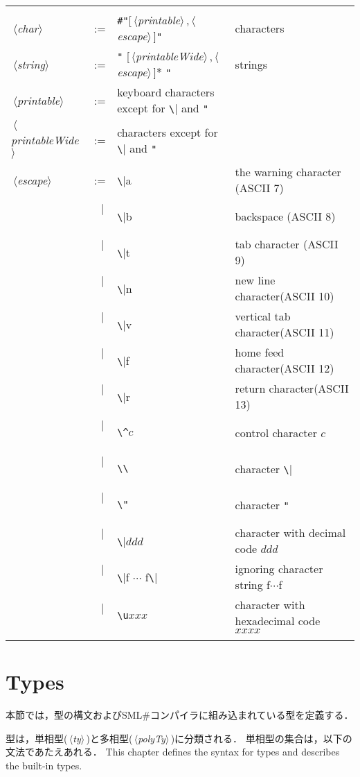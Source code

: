 \documentclass{jbook}
\newcommand{\txt}[2]{#2}
\newcommand{\smlsharp}{SML\#}
\newcommand{\vbar}{\mbox{\ $|$\ }}
\newcommand{\nonterm}[1]{\mbox{$\,\langle$}{\it #1}\mbox{$\rangle\,$}}
\begin{document}
\begin{description}
\begin{center}
\begin{tabular}{lcll}
&\\
\nonterm{char} &:=& \verb|#"|[\nonterm{printable},\nonterm{escape}]\verb|"|&characters\\
\nonterm{string} &:=& \verb|"| [\nonterm{printableWide},\nonterm{escape}]$*$ \verb|"|&strings\\
\nonterm{printable} &:=& keyboard characters except for \verb|\| and \verb|"|\\
\nonterm{printableWide} &:=& characters except for \verb|\| and \verb|"|\\
\nonterm{escape} &:=& \verb|\|a & the warning character (ASCII 7)\\
&\vbar&\verb|\|b & backspace (ASCII 8)\\
&\vbar&\verb|\|t & tab character (ASCII 9)\\
&\vbar&\verb|\|n & new line character(ASCII 10)\\
&\vbar&\verb|\|v & vertical tab character(ASCII 11)\\
&\vbar&\verb|\|f & home feed character(ASCII 12)\\
&\vbar&\verb|\|r & return character(ASCII 13)\\
&\vbar&\verb|\^|$c$ &control character $c$\\
&\vbar&\verb|\\| & character \verb|\|\\
&\vbar&\verb|\"| & character \verb|"|\\   %
&\vbar&\verb|\|$ddd$ &
character with decimal code $ddd$\\
&\vbar&\verb|\|f $\cdots$ f\verb|\|& ignoring character string f$\cdots$f
\\
&\vbar&\verb|\u|$xxx$& character with hexadecimal code $xxxx$\\
\\
\end{tabular}
\end{center}
\fi%
\end{description}

\chapter{\txt{型}{Types}}
\label{chap:reference:types}

\ifjp%
	本節では，型の構文および\smlsharp{}コンパイラに組み込まれている型を定義する．
	
	型は，単相型(\nonterm{ty})と多相型(\nonterm{polyTy})に分類される．
	単相型の集合は，以下の文法であたえあれる．
\else%
	This chapter defines the syntax for types and describes the
built-in types.
\end{document}
